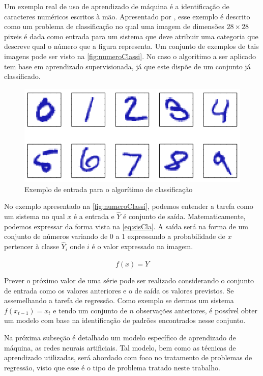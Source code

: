\documentclass[
    12pt,
    oneside,
    a4paper,
    english,
    brazil
]{abntex2}
\begin{document}
Um    exemplo   real    de    uso    de   aprendizado    de    máquina   é    a
identificação  de   caracteres  numéricos  escritos  à   mão.  Apresentado  por
,  esse  exemplo é  descrito  como  um problema  de
classificação no qual uma imagem de dimensões $28 \times 28$ pixeis é dada como
entrada para  um sistema que  deve atribuir uma  categoria que descreve  qual o
número que  a figura representa. Um  conjunto de exemplos de  tais imagens pode
ser visto  na \autoref{fig:numeroClassi}. No  caso o algoritimo a  ser aplicado
tem base  em aprendizado supervisionada, já  que este dispõe de  um conjunto já
classificado.

\begin{figure}[ht]
    \centering
    \caption{Exemplo de entrada para o algorítimo de
        classificação}\label{fig:numeroClassi}
    \includegraphics[width=.5\linewidth]{images/numeroClassificacao.png}
\end{figure}

No exemplo apresentado na \autoref{fig:numeroClassi}, podemos entender a tarefa
como  um sistema  no qual  $x$ é  a entrada  e $\hat{Y}$  é conjunto  de saída.
Matematicamente,  podemos expressar  da forma  vista na  \autoref{eq:sisCla}. A
saída será na forma  de um conjunto de números variando de 0  a 1 expressando a
probabilidade  de  $x$ pertencer  à  classe  $\hat{Y}_i$  onde  $i$ é  o  valor
expressado na imagem.

\begin{equation}
    \label{eq:sisCla}
    f(x) = \hat{Y}
\end{equation}

Prever o próximo valor de uma  série pode ser realizado considerando o conjunto
de entrada  como os valores  anteriores e o de  saída os valores  previstos. Se
assemelhando  a  tarefa  de  regressão.  Como  exemplo  se  dermos  um  sistema
$f{(x_{t-1})}  = x_t$  e tendo  um conjunto  de $n$  observações anteriores,  é
possível obter um modelo com base na identificação de padrões encontrados nesse
conjunto.

Na  próxima subseção é  detalhado um modelo específico de  aprendizado de  máquina, as redes neurais artificiais. Tal modelo, bem como as técnicas de aprendizado utilizadas, será abordado com foco no tratamento de problemas de regressão, visto que esse é o tipo de problema tratado neste trabalho. 
\end{document}
